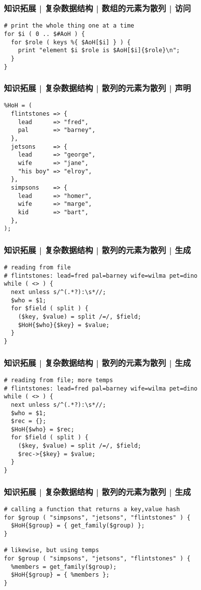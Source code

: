 \begin{frame}[fragile]
  \frametitle{知识拓展 | 复杂数据结构 | 数组的元素为散列 | 访问}
\begin{lstlisting}
# print the whole thing one at a time
for $i ( 0 .. $#AoH ) {
  for $role ( keys %{ $AoH[$i] } ) {
    print "element $i $role is $AoH[$i]{$role}\n";
  }
}
\end{lstlisting}
\end{frame}

\begin{frame}[fragile]
  \frametitle{知识拓展 | 复杂数据结构 | 散列的元素为散列 | 声明}
  \vspace{-0.8em}
\begin{lstlisting}
%HoH = (
  flintstones => {
    lead      => "fred",
    pal       => "barney",
  },
  jetsons     => {
    lead      => "george",
    wife      => "jane",
    "his boy" => "elroy",
  },
  simpsons    => {
    lead      => "homer",
    wife      => "marge",
    kid       => "bart",
  },
);
\end{lstlisting}
\end{frame}

\begin{frame}[fragile]
  \frametitle{知识拓展 | 复杂数据结构 | 散列的元素为散列 | 生成}
\begin{lstlisting}
# reading from file
# flintstones: lead=fred pal=barney wife=wilma pet=dino
while ( <> ) {
  next unless s/^(.*?):\s*//;
  $who = $1;
  for $field ( split ) {
    ($key, $value) = split /=/, $field;
    $HoH{$who}{$key} = $value;
  }
}
\end{lstlisting}
\end{frame}

\begin{frame}[fragile]
  \frametitle{知识拓展 | 复杂数据结构 | 散列的元素为散列 | 生成}
\begin{lstlisting}
# reading from file; more temps
# flintstones: lead=fred pal=barney wife=wilma pet=dino
while ( <> ) {
  next unless s/^(.*?):\s*//;
  $who = $1;
  $rec = {};
  $HoH{$who} = $rec;
  for $field ( split ) {
    ($key, $value) = split /=/, $field;
    $rec->{$key} = $value;
  }
}
\end{lstlisting}
\end{frame}

\begin{frame}[fragile]
  \frametitle{知识拓展 | 复杂数据结构 | 散列的元素为散列 | 生成}
\begin{lstlisting}
# calling a function that returns a key,value hash
for $group ( "simpsons", "jetsons", "flintstones" ) {
  $HoH{$group} = { get_family($group) };
}

# likewise, but using temps
for $group ( "simpsons", "jetsons", "flintstones" ) {
  %members = get_family($group);
  $HoH{$group} = { %members };
}
\end{lstlisting}
\end{frame}

